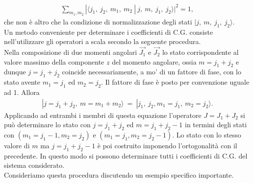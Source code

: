 \documentclass[a4paper,12pt,oneside]{book}
\begin{document}
\begin{align}
 \sum_{m_1, m_2} {|\langle j_1 ,~ j_2,~m_1, ~ m_2 ~|~ j ,~ m,~j_1, ~ j_2 \rangle|^2} =1 , 
\end{align}
che non è altro che la condizione di normalizzazione degli stati $| j ,~ m,~j_1, ~ j_2 \rangle $. \\
Un metodo conveniente per determinare i coefficienti di C.G. consiste nell'utilizzare gli operatori a scala secondo la seguente procedura. \\
Nella composizione di due momenti angolari $\vec{J_1}$ e  $\vec{J_2}$ lo stato corrispondente al valore massimo della componente $z$ del momento angolare, ossia $m= j_1+j_2$ e dunque $j=j_1+j_2$ coincide necessariamente, a mo' di un fattore di fase, con lo stato avente $m_1=j_1$ ed $m_2=j_2$. Il fattore di fase è posto per convenzione uguale ad 1. Allora
\begin{align}
| j= j_1 + j_2 ,~m= m_1 +m_2  \rangle ~= ~| j_1 ,~j_2,  m_1=j_1, ~m_2= j_2 \rangle .
\end{align}
Applicando ad entrambi i membri di questa equazione l'operatore $J=J_1+J_2$ si può determinare lo stato con $j=j_1+j_2$ ed $m=j_1+j_2-1$ in termini degli stati con $(m_1=j_1-1 , m_2=j_2)$ e $(m_1=j_1, m_2=j_2-1)$. Lo stato con lo stesso valore di $m$ ma $j=j_1+j_2-1$ è poi costruito imponendo l'ortogonalità con il precedente. In questo modo si possono determinare tutti i coefficienti di C.G. del sistema considerato. \\
Consideriamo questa procedura discutendo un esempio specifico importante.
\end{document}
